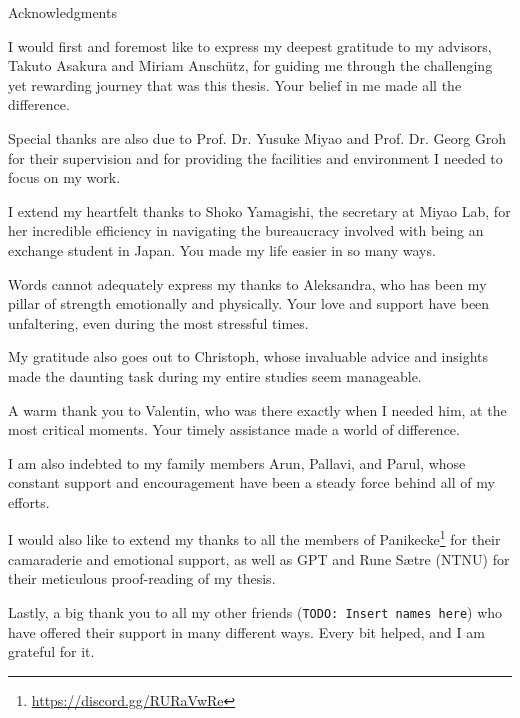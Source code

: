 \thispagestyle{empty}

\vspace*{20mm}

\begin{center}
    { Acknowledgments}
\end{center}

\vspace{10mm}

I would first and foremost like to express my deepest gratitude to my advisors, Takuto Asakura and Miriam Anschütz, for guiding me through the challenging yet rewarding journey that was this thesis. Your belief in me made all the difference.

Special thanks are also due to Prof. Dr. Yusuke Miyao and Prof. Dr. Georg Groh for their supervision and for providing the facilities and environment I needed to focus on my work.

I extend my heartfelt thanks to Shoko Yamagishi, the secretary at Miyao Lab, for her incredible efficiency in navigating the bureaucracy involved with being an exchange student in Japan. You made my life easier in so many ways.

Words cannot adequately express my thanks to Aleksandra, who has been my pillar of strength emotionally and physically. Your love and support have been unfaltering, even during the most stressful times.

My gratitude also goes out to Christoph, whose invaluable advice and insights made the daunting task during my entire studies seem manageable.

A warm thank you to Valentin, who was there exactly when I needed him, at the most critical moments. Your timely assistance made a world of difference.

I am also indebted to my family members Arun, Pallavi, and Parul, whose constant support and encouragement have been a steady force behind all of my efforts.

I would also like to extend my thanks to all the members of Panikecke\footnote{\url{https://discord.gg/RURaVwRe}} for their camaraderie and emotional support, as well as GPT and Rune S{\ae}tre (NTNU) for their meticulous proof-reading of my thesis.

Lastly, a big thank you to all my other friends (\texttt{TODO: Insert names here}) who have offered their support in many different ways. Every bit helped, and I am grateful for it.

\cleardoublepage{}
